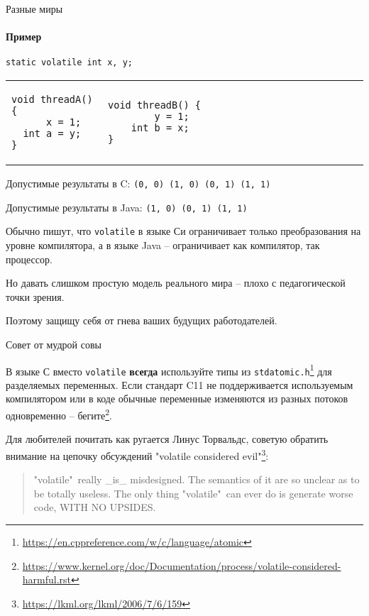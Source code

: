 \begin{frame}{Разные миры}
\framesubtitle{Пример}

\begin{verbatim}
static volatile int x, y; 
\end{verbatim}

\begin{tabular}{p{} p{}}
\begin{verbatim}
void threadA() {
      x = 1;
  int a = y;
}
\end{verbatim}

& 

\begin{verbatim}
void threadB() {                                   
        y = 1;                           
    int b = x;                           
}                    
\end{verbatim}
\end{tabular}

Допустимые результаты в C: \texttt{(0, 0) (1, 0) (0, 1) (1, 1)}

Допустимые результаты в Java: \texttt{(1, 0) (0, 1) (1, 1)}

\pause
Обычно пишут, что \texttt{volatile} в языке Си ограничивает только преобразования на уровне компилятора, а в языке Java -- ограничивает как компилятор, так процессор.

\pause
Но давать слишком простую модель реального мира -- плохо с педагогической точки зрения.

\pause
Поэтому защищу себя от гнева ваших будущих работодателей.

\end{frame}


\begin{frame}{Совет от мудрой совы}

В языке С вместо \texttt{volatile} \textbf{всегда} используйте типы из \texttt{stdatomic.h}\footnote{\tiny\url{https://en.cppreference.com/w/c/language/atomic}} для разделяемых переменных.
Если стандарт C11 не поддерживается используемым компилятором или в коде обычные переменные изменяются из разных потоков одновременно -- бегите\footnote{\tiny\url{https://www.kernel.org/doc/Documentation/process/volatile-considered-harmful.rst}}.

\pause

Для любителей почитать как ругается Линус Торвальдс, советую обратить внимание на цепочку обсуждений "volatile considered evil"\footnote<2->{\tiny\url{https://lkml.org/lkml/2006/7/6/159}}:

\begin{quote}
 "volatile"\ really \_is\_ misdesigned. The semantics of it are so unclear as to be totally useless. The only thing "volatile"\ can ever do is generate worse code, WITH NO UPSIDES.
\end{quote}

\end{frame}


